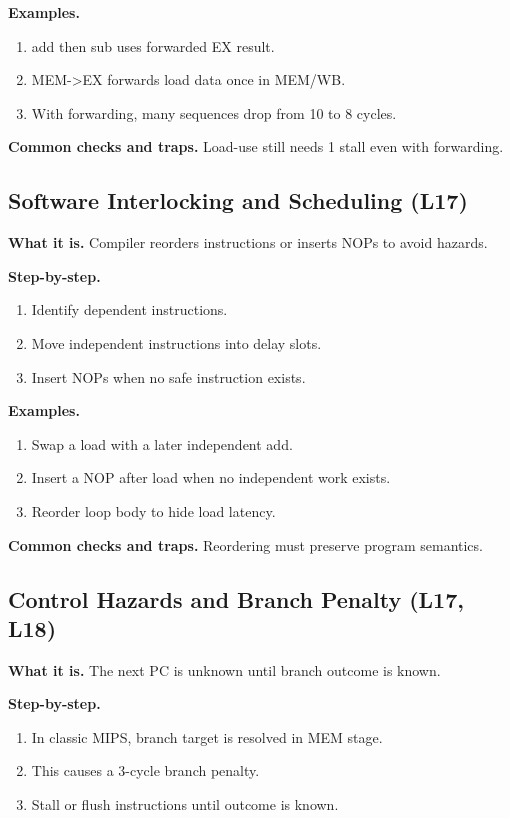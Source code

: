 \documentclass[11pt]{article}
\begin{document}
\textbf{Examples.}
\begin{enumerate}[leftmargin=*]
  \item add then sub uses forwarded EX result.
  \item MEM->EX forwards load data once in MEM/WB.
  \item With forwarding, many sequences drop from 10 to 8 cycles.
\end{enumerate}

\textbf{Common checks and traps.} Load-use still needs 1 stall even with forwarding.

\begin{figure}[h]
\centering
{}
\end{figure}

\subsection{Software Interlocking and Scheduling (L17)}
\textbf{What it is.} Compiler reorders instructions or inserts NOPs to avoid hazards.

\textbf{Step-by-step.}
\begin{enumerate}[leftmargin=*]
  \item Identify dependent instructions.
  \item Move independent instructions into delay slots.
  \item Insert NOPs when no safe instruction exists.
\end{enumerate}

\textbf{Examples.}
\begin{enumerate}[leftmargin=*]
  \item Swap a load with a later independent add.
  \item Insert a NOP after load when no independent work exists.
  \item Reorder loop body to hide load latency.
\end{enumerate}

\textbf{Common checks and traps.} Reordering must preserve program semantics.

\subsection{Control Hazards and Branch Penalty (L17, L18)}
\textbf{What it is.} The next PC is unknown until branch outcome is known.

\textbf{Step-by-step.}
\begin{enumerate}[leftmargin=*]
  \item In classic MIPS, branch target is resolved in MEM stage.
  \item This causes a 3-cycle branch penalty.
  \item Stall or flush instructions until outcome is known.
\end{enumerate}
\end{document}
